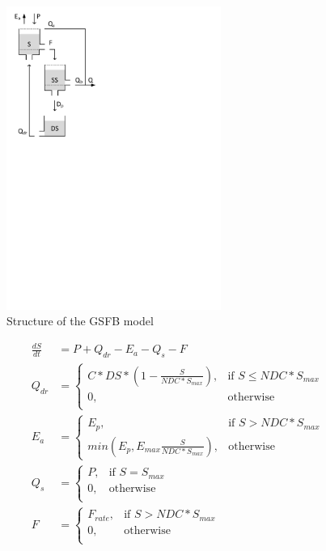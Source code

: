 { 																	%
\begin{figure}
\includegraphics[trim=1cm 17cm 7cm 1cm,width=7cm,keepaspectratio]{./AppA_files/20_schematic.pdf}
\caption{Structure of the GSFB model} \label{fig:20_schematic}
\end{figure}

\begin{align}
	\frac{dS}{dt} &= P + Q_{dr}- E_a -Q_s-F \\
	Q_{dr} &= \begin{cases}
		C*DS*\left(1-\frac{S}{NDC*S_{max}}\right), &\text{if } S \leq NDC*S_{max} \\
		0, & \text{otherwise} \\
	\end{cases} \\
	E_a &= 
	\begin{cases}
		E_p, & \text{if } S > NDC*S_{max} \\
		min\left(E_p, E_{max}\frac{S}{NDC*S_{max}}\right), & \text{otherwise}
	\end{cases} \\
	Q_s &= \begin{cases}
		P, &\text{if } S = S_{max} \\
		0, & \text{otherwise} \\
	\end{cases} \\
	F &= \begin{cases}
		F_{rate}, &\text{if } S > NDC*S_{max} \\
		0, & \text{otherwise} \\
	\end{cases} 
\end{align}

} %
\vspace{1cm}

